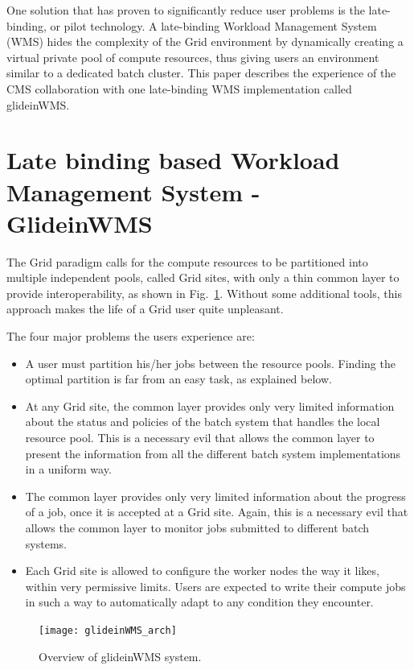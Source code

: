 \documentclass[a4paper]{jpconf}
\begin{document}
One solution that has proven to significantly reduce user problems is the late-binding, or pilot technology.  
A late-binding Workload Management System (WMS) hides the complexity of the Grid environment by dynamically creating 
a virtual private pool of compute resources, thus giving users an environment similar to a dedicated batch cluster.
This paper describes the experience of the CMS collaboration with one late-binding WMS implementation called glideinWMS. 
\section{Late binding based Workload Management System - GlideinWMS }
The Grid paradigm calls for the compute resources to be partitioned into multiple independent pools, called Grid sites,
with only a thin common layer to provide interoperability, as shown in Fig.~\ref{fig:glideinWMS}.
Without some additional tools, this approach makes the life of a Grid user quite unpleasant. 

The four major problems the users experience are:
\begin {itemize}
\item 
A user must partition his/her jobs between the resource pools.
Finding the optimal partition is far from an easy task, as explained below.
\item
At any Grid site, the common layer provides only very limited information about the status and policies of the
batch system that handles the local resource pool.
This is a necessary evil that allows the common layer to present the information from all the different batch system 
implementations in a uniform way. 
\item 
The common layer provides only very limited information about the progress of a job, once it is accepted at a Grid site.
Again, this is a necessary evil that allows the common layer to monitor jobs submitted to different batch systems.  
\item
Each Grid site is allowed to configure the worker nodes the way it likes, within very permissive limits.
Users are expected to write their compute jobs in such a way to automatically adapt to any condition they encounter.
\end{itemize}
\begin{figure}
\begin{center}
\texttt{[image: glideinWMS\_arch]}
\end{center}
\caption{Overview of glideinWMS system.}
\label{fig:glideinWMS}
\end{figure}
\end{document}
